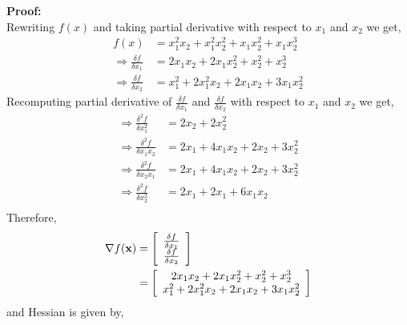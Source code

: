 \documentclass[a4paper,10pt]{article}
\begin{document}
\begin{enumerate}
\begin{taskbox}
    \end{taskbox}
    \\ \\ \textbf{Proof:} \\
    Rewriting $f(x)$ and taking partial derivative with respect to $x_1$ and $x_2$ we get,
    \begin{equation}
        \begin{split}
            f(x) & = x_1^2x_2 + x_1^2x_2^2 + x_1x_2^2 + x_1x_2^3 \\
            \Rightarrow \frac{\delta f}{\delta x_1} & = 2x_1x_2 + 2x_1x_2^2 + x_2^2 + x_2^3 \\
            \Rightarrow \frac{\delta f}{\delta x_2} & = x_1^2 + 2x_1^2x_2 + 2x_1x_2 + 3x_1x_2^2
        \end{split}
    \end{equation}
    Recomputing partial derivative of $\frac{\delta f}{\delta x_1}$ and $\frac{\delta f}{\delta x_2}$ with respect to $x_1$ and $x_2$ we get,
    \begin{equation}
        \begin{split}
            \Rightarrow \frac{\delta^2f}{\delta x_1^2} & = 2x_2 + 2x_2^2 \\
            \Rightarrow \frac{\delta^2f}{\delta x_1x_2} & = 2x_1 + 4x_1x_2 + 2x_2 + 3x_2^2 \\
            \Rightarrow \frac{\delta^2f}{\delta x_2x_1} & = 2x_1 + 4x_1x_2 + 2x_2 + 3x_2^2 \\
            \Rightarrow \frac{\delta^2f}{\delta x_2^2} & = 2x_1 + 2x_1 + 6x_1x_2 \\
        \end{split}
    \end{equation}
    Therefore,
    \begin{equation}
        \begin{split}
            \nabla f(\mathbf{x}) & =\left[\begin{array}{c c} \frac{\delta f}{\delta x_1} \\ \frac{\delta f}{\delta x_2} \end{array} \right] \\
            & = \left[\begin{array}{c c} 2x_1x_2 + 2x_1x_2^2 + x_2^2 + x_2^3 \\ x_1^2 + 2x_1^2x_2 + 2x_1x_2 + 3x_1x_2^2 \end{array} \right] 
        \end{split}
    \end{equation}
    and Hessian is given by,

\end{enumerate}
\end{document}
